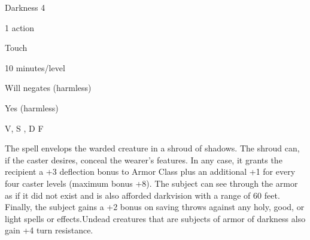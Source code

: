
\begin{description*}
\item[Level:] Darkness 4
\item[Casting Time:] 1 action
\item[Range:] Touch
\item[Duration:] 10 minutes/level
\item[Saving Throw:] Will negates (harmless)
\item[Spell Resistance:] Yes (harmless)
\item[Components:] V, S , D F
\end{description*}

The spell envelops the warded creature in a shroud of shadows. The shroud can,
if the caster desires, conceal the wearer's features. In any case, it grants the
recipient a +3 deflection bonus to Armor Class plus an additional +1 for every
four caster levels (maximum bonus +8). The subject can see through the armor as
if it did not exist and is also afforded darkvision with a range of 60 feet. Finally,
the subject gains a +2 bonus on saving throws against any holy, good, or light
spells or effects.Undead creatures that are subjects of armor of darkness
also gain +4 turn resistance.